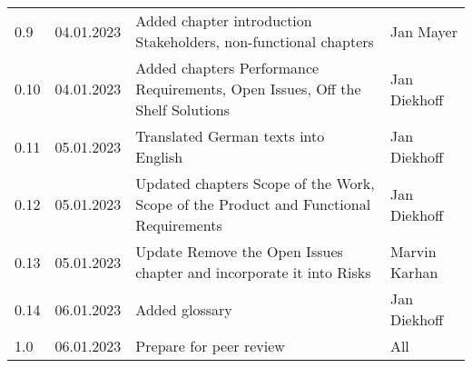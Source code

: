 \begin{footnotesize}
\begin{longtable}[L L L L]{ p{} p{} p{} p{} }
    0.9              & 04.01.2023    & Added chapter introduction Stakeholders, non-functional chapters                     & Jan Mayer       \\
    
    0.10              & 04.01.2023    & Added chapters Performance Requirements, Open Issues, Off the Shelf Solutions        & Jan Diekhoff    \\
    
    0.11              & 05.01.2023    & Translated German texts into English                                                 & Jan Diekhoff    \\
    
    0.12             & 05.01.2023    & Updated chapters Scope of the Work, Scope of the Product and Functional Requirements & Jan Diekhoff    \\
    
    0.13             & 05.01.2023    & Update Remove the Open Issues chapter and incorporate it into Risks                  & Marvin Karhan   \\
    
    0.14             & 06.01.2023    & Added glossary                                                                       & Jan Diekhoff    \\
    1.0 & 06.01.2023 & Prepare for peer review & All \\
    
    \bottomrule
  \end{longtable}
\end{footnotesize}
\rmfamily